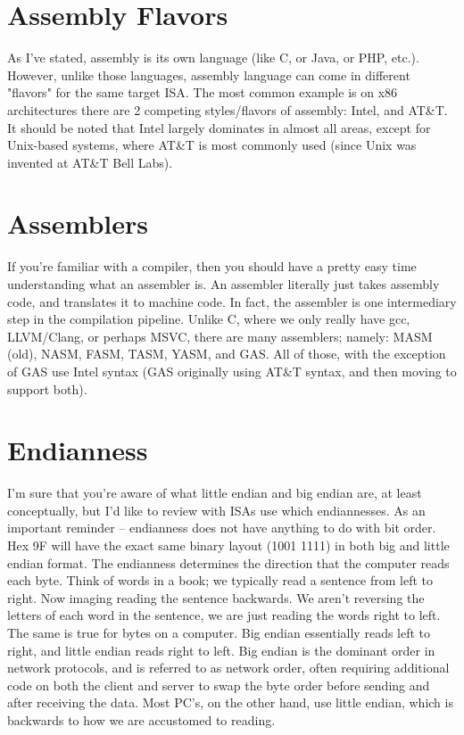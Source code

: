 \documentclass{article}
\begin{document}
\section{Assembly Flavors}

   As I’ve stated, assembly is its own language (like C, or Java, or PHP, etc.). However, unlike those languages, assembly 
   language can come in different "flavors" for the same target ISA. The most common example is on x86 architectures there 
   are 2 competing styles/flavors of assembly: Intel, and AT\&T. It should be noted that Intel largely dominates in almost all 
   areas, except for Unix-based systems, where AT\&T is most commonly used (since Unix was invented at AT\&T Bell Labs). 

\section{Assemblers}

	If you’re familiar with a compiler, then you should have a pretty easy time understanding what an assembler is. An 
   assembler literally just takes assembly code, and translates it to machine code. In fact, the assembler is one intermediary step 
   in the compilation pipeline. Unlike C, where we only really have gcc, LLVM/Clang, or perhaps MSVC, there are many assemblers; 
   namely: MASM (old), NASM, FASM, TASM, YASM, and GAS. All of those, with the exception of GAS use Intel syntax 
   (GAS originally using AT\&T syntax, and then moving to support both). 

\section{Endianness}

	I’m sure that you’re aware of what little endian and big endian are, at least conceptually, but I’d like to 
   review with ISAs use which endiannesses. As an important reminder – endianness does not have anything to do with bit 
   order. Hex 9F will have the exact same binary layout (1001 1111) in both big and little endian format. The 
   endianness determines the direction that the computer reads each byte. Think of words in a book; we typically read a 
   sentence from left to right. Now imaging reading the sentence backwards. We aren’t reversing the letters of each word in 
   the sentence, we are just reading the words right to left. The same is true for bytes on a computer. 
   Big endian essentially reads left to right, and little endian reads right to left. Big endian is the dominant order 
   in network protocols, and is referred to as network order, often requiring additional code on both the client and server 
   to swap the byte order before sending and after receiving the data. Most PC’s, on the other hand, use little 
   endian, which is backwards to how we are accustomed to reading. 
\end{document}
